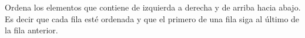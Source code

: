 Ordena los elementos que contiene de izquierda a derecha y de arriba hacia abajo. Es decir 
que cada fila esté ordenada y que el primero de una fila siga al último de la fila anterior.